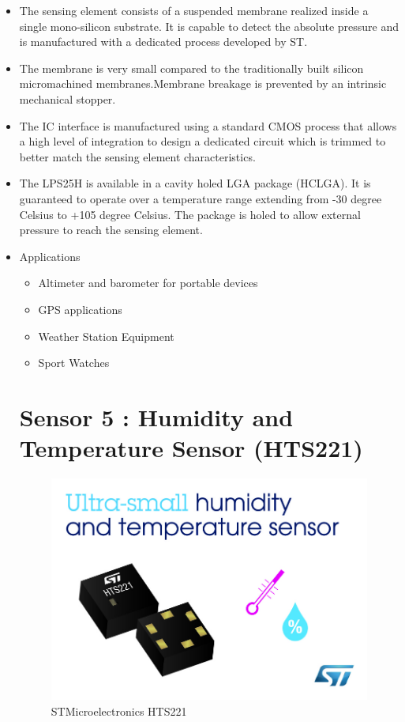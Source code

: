 \documentclass[11pt,a4paper]{article}
\begin{document}
\begin{itemize}
\item The sensing element consists of a suspended
membrane realized inside a single mono-silicon
substrate. It is capable to detect the absolute
pressure and is manufactured with a dedicated
process developed by ST.

\item The membrane is very small compared to the
traditionally built silicon micromachined
membranes.Membrane breakage is prevented
by an intrinsic mechanical stopper.

\item The IC interface is manufactured using a standard
CMOS process that allows a high level of
integration to design a dedicated circuit which is
trimmed to better match the sensing element
characteristics.

\item The LPS25H is available in a cavity holed LGA
package (HCLGA). It is guaranteed to operate
over a temperature range extending from -30 degree Celsius
to +105 degree Celsius. The package is holed to allow
external pressure to reach the sensing element.

\item Applications
\begin{itemize}
\item Altimeter and barometer for portable devices
\item GPS applications
\item Weather Station Equipment
\item Sport Watches
\end{itemize}


\newpage
\section{Sensor 5 : Humidity and Temperature Sensor (HTS221)}
\begin{figure}[h]
    \centering
	\includegraphics{HT.jpg}
	\caption {STMicroelectronics HTS221}
	\end{figure}
	

\end{itemize}
\end{document}
